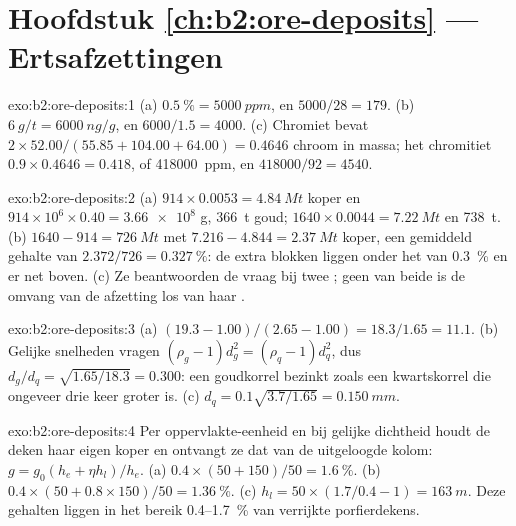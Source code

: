 \section*{Hoofdstuk \ref{ch:b2:ore-deposits} --- Ertsafzettingen}

\begin{solution}{exo:b2:ore-deposits:1}
(a) $\qty{0.5}{\percent} = \qty{5000}{ppm}$, en $5000/28 = 179$. (b) $\qty{6}{g/t} = \qty{6000}{ng/g}$,
en $6000/1.5 = 4000$. (c) Chromiet bevat $2 \times 52.00/(55.85 + 104.00 + 64.00) = 0.4646$
chroom in massa; het chromitiet $0.9 \times 0.4646 = 0.418$, of \qty{418000}{ppm}, en
$418000/92 = 4540$.
\end{solution}

\begin{solution}{exo:b2:ore-deposits:2}
(a) $914 \times 0.0053 = \qty{4.84}{Mt}$ koper en $914 \times 10^6 \times 0.40 = \num{3.66e8}$ g,
\qty{366}{t} goud; $1640 \times 0.0044 = \qty{7.22}{Mt}$ en \qty{738}{t}. (b) $1640 - 914 =
\qty{726}{Mt}$ met $7.216 - 4.844 = \qty{2.37}{Mt}$ koper, een gemiddeld gehalte van
$2.372/726 = \qty{0.327}{\percent}$: de extra blokken liggen onder het  van \qty{0.3}{\percent}
en er net boven. (c) Ze beantwoorden de vraag bij twee ; geen van beide is de omvang van de
afzetting los van haar .
\end{solution}

\begin{solution}{exo:b2:ore-deposits:3}
(a) $(19.3 - 1.00)/(2.65 - 1.00) = 18.3/1.65 = 11.1$. (b) Gelijke snelheden vragen $(\rho_g - 1)d_g^2 =
(\rho_q - 1)d_q^2$, dus $d_g/d_q = \sqrt{1.65/18.3} = 0.300$: een goudkorrel bezinkt zoals een
kwartskorrel die ongeveer drie keer groter is. (c) $d_q = 0.1\sqrt{3.7/1.65} = \qty{0.150}{mm}$.
\end{solution}

\begin{solution}{exo:b2:ore-deposits:4}
Per oppervlakte-eenheid en bij gelijke dichtheid houdt de deken haar eigen koper en ontvangt ze dat van de uitgeloogde
kolom: $g = g_0(h_e + \eta h_l)/h_e$. (a) $0.4 \times (50 + 150)/50 = \qty{1.6}{\percent}$.
(b) $0.4 \times (50 + 0.8 \times 150)/50 = \qty{1.36}{\percent}$. (c) $h_l = 50 \times (1.7/0.4 - 1)
= \qty{163}{m}$. Deze gehalten liggen in het bereik 0.4--\qty{1.7}{\percent} van verrijkte
porfierdekens.
\end{solution}


